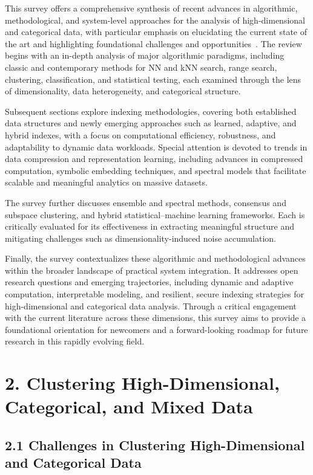 \documentclass[11pt]{article}
\begin{document}
This survey offers a comprehensive synthesis of recent advances in algorithmic, methodological, and system-level approaches for the analysis of high-dimensional and categorical data, with particular emphasis on elucidating the current state of the art and highlighting foundational challenges and opportunities~\cite{ref116, ref117, ref118}. The review begins with an in-depth analysis of major algorithmic paradigms, including classic and contemporary methods for NN and kNN search, range search, clustering, classification, and statistical testing, each examined through the lens of dimensionality, data heterogeneity, and categorical structure.

Subsequent sections explore indexing methodologies, covering both established data structures and newly emerging approaches such as learned, adaptive, and hybrid indexes, with a focus on computational efficiency, robustness, and adaptability to dynamic data workloads. Special attention is devoted to trends in data compression and representation learning, including advances in compressed computation, symbolic embedding techniques, and spectral models that facilitate scalable and meaningful analytics on massive datasets.

The survey further discusses ensemble and spectral methods, consensus and subspace clustering, and hybrid statistical–machine learning frameworks. Each is critically evaluated for its effectiveness in extracting meaningful structure and mitigating challenges such as dimensionality-induced noise accumulation.

Finally, the survey contextualizes these algorithmic and methodological advances within the broader landscape of practical system integration. It addresses open research questions and emerging trajectories, including dynamic and adaptive computation, interpretable modeling, and resilient, secure indexing strategies for high-dimensional and categorical data analysis. Through a critical engagement with the current literature across these dimensions, this survey aims to provide a foundational orientation for newcomers and a forward-looking roadmap for future research in this rapidly evolving field.

\section{2. Clustering High-Dimensional, Categorical, and Mixed Data}

\subsection{2.1 Challenges in Clustering High-Dimensional and Categorical Data}
\end{document}
